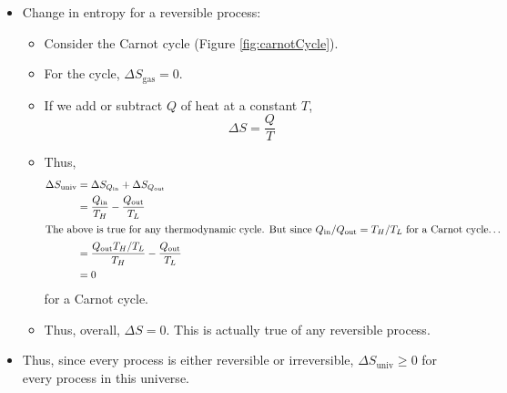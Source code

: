 \documentclass[../notes.tex]{subfiles}
\begin{document}
\begin{itemize}
\begin{itemize}
    \end{itemize}
    \item Change in entropy for a reversible process:
    \begin{itemize}
        \item Consider the Carnot cycle (Figure \ref{fig:carnotCycle}).
        \item For the cycle, $\Delta S_\text{gas}=0$.
        \item If we add or subtract $Q$ of heat at a constant $T$,
        \begin{equation*}
            \Delta S = \frac{Q}{T}
        \end{equation*}
        \item Thus,
        \begin{align*}
            \Delta S_\text{univ} &= \Delta S_{Q_\text{in}}+\Delta S_{Q_\text{out}}\\
            &= \frac{Q_\text{in}}{T_H}-\frac{Q_\text{out}}{T_L}\\
            \intertext{The above is true for any thermodynamic cycle. But since $Q_\text{in}/Q_\text{out}=T_H/T_L$ for a Carnot cycle\dots}
            &= \frac{Q_\text{out}T_H/T_L}{T_H}-\frac{Q_\text{out}}{T_L}\\
            &= 0
        \end{align*}
        for a Carnot cycle.
        \item Thus, overall, $\Delta S=0$. This is actually true of any reversible process.
    \end{itemize}
    \item Thus, since every process is either reversible or irreversible, $\Delta S_\text{univ}\geq 0$ for every process in this universe.
\end{itemize}
\end{document}
